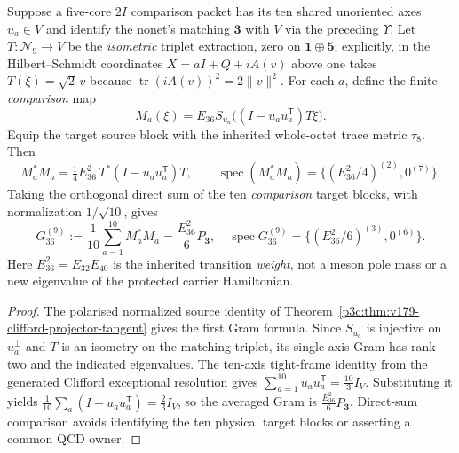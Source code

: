 \documentclass[12pt,a4paper]{article}
\begin{document}
\begin{proposition}
\label{p11:prop:v159-e36-nonet-triplet-gram}
Suppose a five-core $2I$ comparison packet has its ten shared unoriented
axes $u_a\in V$ and identify the nonet's matching $\mathbf3$ with
$V$ via the preceding $\Upsilon$. Let
$T:\mathcal N_9\to V$ be the \emph{isometric} triplet extraction,
zero on $\mathbf1\oplus\mathbf5$; explicitly, in the
Hilbert--Schmidt coordinates $X=aI+Q+iA(v)$ above one takes
$T(\xi)=\sqrt2\,v$ because
$\operatorname{tr}(iA(v))^2=2\|v\|^2$.
For each $a$, define the finite \emph{comparison} map
\[
 M_a(\xi)=E_{36}S_{u_a}\bigl((I-u_au_a^{\mathsf T})T\xi\bigr).
\]
Equip the target source block with the inherited whole-octet trace
metric $\tau_8$. Then
\[
 M_a^*M_a=\tfrac14E_{36}^2\,T^*
  (I-u_au_a^{\mathsf T})T,
 \qquad \operatorname{spec}(M_a^*M_a)
  =\{(E_{36}^2/4)^{(2)},0^{(7)}\}.
\]
Taking the orthogonal direct sum of the ten \emph{comparison} target
blocks, with normalization $1/\sqrt{10}$, gives
\[
\boxed{G_{36}^{(9)}:=\frac1{10}\sum_{a=1}^{10}M_a^*M_a
    =\frac{E_{36}^2}{6}P_{\mathbf3},\quad
 \operatorname{spec}G_{36}^{(9)}
    =\{(E_{36}^2/6)^{(3)},0^{(6)}\}.}
\]
Here $E_{36}^2=E_{32}E_{40}$ is the inherited transition
\emph{weight}, not a meson pole mass or a new eigenvalue of the
protected carrier Hamiltonian.
\end{proposition}
\begin{proof}
The polarised normalized source identity of
Theorem~\ref{p3c:thm:v179-clifford-projector-tangent}
gives the first Gram formula. Since $S_{u_a}$ is injective on
$u_a^\perp$ and $T$ is an isometry on the matching triplet, its
single-axis Gram has rank two and the indicated eigenvalues.
The ten-axis tight-frame identity from the generated Clifford
exceptional resolution gives
$\sum_{a=1}^{10}u_au_a^{\mathsf T}=\tfrac{10}{3}I_V$.
Substituting it yields
$\frac1{10}\sum_a(I-u_au_a^{\mathsf T})=\frac23 I_V$,
so the averaged Gram is $\frac{E_{36}^2}{6}P_{\mathbf3}$.
Direct-sum comparison avoids identifying the ten physical target
blocks or asserting a common QCD owner.
\end{proof}
\end{document}
